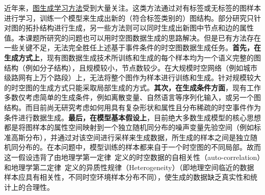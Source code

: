 \documentclass[12pt,UTF8,AutoFakeBold=2,a4paper]{ctexart} %
\begin{document}





近年来，\underline{图生成学习方法}受到大量关注。这类方法通过对有标签或无标签的图样本进行学习，训练一个模型来生成出新的（符合标签类别的）图结构。部分研究只针对图的拓扑结构进行生成，另一些方法则可以同时生成出新图中节点和边的属性值。本课题所研究的问题也可以用时空图数据生成的思路解决。但是已有方法存在一些关键不足，无法完全胜任上述基于事件条件的时空图数据生成任务。\textbf{首先，在生成方式上}，现有图数据生成技术所训练和生成的每个样本均为一个语义完整的图结构（例如分子结构），且规模较小，节点数较少。在大规模时空网络（例如城市级路网有上万个路段）上，无法将整个图作为样本进行训练和生成。针对规模较大的时空图的生成方式只能采取局部生成的方式。\textbf{其次，在生成条件方面}，现有工作多数仅考虑简单的生成条件，例如离散变量、自然语言等序列化输入，或另一个图结构。而目前尚无研究考虑如何用具有复杂形状和属性且分布稀疏的时空事件作为条件进行数据生成。\textbf{最后，在模型基本假设上}，目前绝大多数生成模型的核心思想都是将图样本的属性空间映射到一个独立随机同分布的噪声变量先验空间（例如标准高斯分布），并通过对该空间进行采样来生成数据，所生成的样本之间是独立随机同分布的。在本问题中，模型训练的样本都来自于一个时空图的不同局部。故而这一假设违背了由地理学第一定律~\cite{tobler1970computer}定义的时空数据的自相关性（auto-correlation）和地理学第二定律~\cite{goodchild2004validity}定义的异质性规律（Heterogeneity）（即地理空间临近的数据样本应具有相关性，不同时空环境样本分布不同），使生成的数据缺乏真实性和统计上的合理性。
\end{document}
